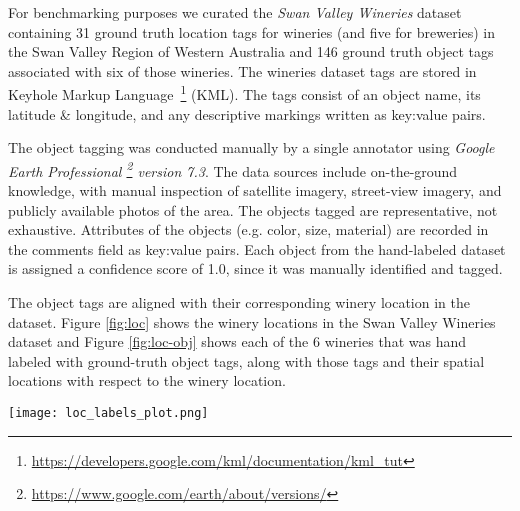 For benchmarking purposes we curated the \emph{Swan Valley Wineries} dataset containing 31 ground truth location tags for wineries (and five for breweries) in the Swan Valley Region of Western Australia and 146 ground truth object tags associated with six of those wineries. 
The wineries dataset tags are stored in Keyhole Markup Language~\footnote{\href{https://developers.google.com/kml/documentation/kml\_tut}{https://developers.google.com/kml/documentation/kml\_tut}} (KML).
The tags consist of an object name, its latitude \& longitude, and any descriptive markings written as key:value pairs. 

The object tagging was conducted manually by a single annotator using \textit{Google Earth Professional \footnote{\href{https://www.google.com/earth/about/versions/}{https://www.google.com/earth/about/versions/}} version 7.3}. 
The data sources include on-the-ground knowledge, with manual inspection of satellite imagery, street-view imagery, and publicly available photos of the area. 
The objects tagged are representative, not exhaustive. 
Attributes of the objects (e.g. color, size, material) are recorded in the comments field as key:value pairs.
Each object from the hand-labeled dataset is assigned a confidence score of 1.0, since it was manually identified and tagged.

The object tags are aligned with their corresponding winery location in the dataset.
Figure \ref{fig:loc} shows the winery locations in the Swan Valley Wineries dataset and Figure \ref{fig:loc-obj} shows each of the 6 wineries that was hand labeled with ground-truth object tags, along with those tags and their spatial locations with respect to the winery location.



\begin{figure*}[ht]       
    \texttt{[image: loc\_labels\_plot.png]}
    \centering
    \caption[width=\textwidth]{The Swan Valley Wineries dataset has six locations with annotated objects, and another 30 without manually annotated objects, but with confirmed location coordinates.}
    \label{fig:loc} 
\end{figure*}


